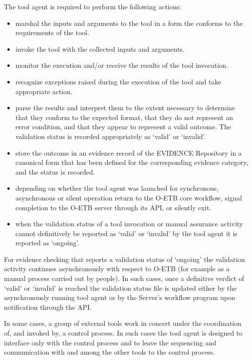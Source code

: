 \documentclass[12pt,twoside,a4paper]{article}
\begin{document}
The tool agent is required to perform the following actions:

\begin{itemize}
\item
  marshal the inputs and arguments to the tool in a form the conforms to the requirements of the tool.
\item
  invoke the tool with the collected inputs and arguments.
\item
  monitor the execution and/or receive the results of the tool invocation.
\item
  recognize exceptions raised during the execution of the tool and take appropriate action.
\item
  parse the results and interpret them to the extent necessary to determine that they conform to the expected format, that they do not represent an error condition, and that they appear to represent a valid outcome. The validation status is recorded appropriately as `valid' or `invalid'.
\item
  store the outcome in an evidence record of the EVIDENCE Repository in a canonical form that has been defined for the corresponding evidence category, and the status is recorded.
\item
  depending on whether the tool agent was launched for synchronous, asynchronous or silent operation return to the O-ETB core workflow, signal completion to the O-ETB server through its API, or silently exit.
\item
  when the validation status of a tool invocation or manual assurance activity cannot definitively be reported as `valid' or `invalid' by the tool agent it is reported as `ongoing'.
\end{itemize}

For evidence checking that reports a validation status of `ongoing' the validation activity continues asynchronously with respect to O-ETB (for example as a manual process carried out by people). In such cases, once a definitive verdict of `valid' or `invalid' is reached the validation status file is updated either by the asynchronously running tool agent or by the Server's workflow program upon notification through the API.

In some cases, a group of external tools work in concert under the coordination of, and invoked by, a control process. In such cases the tool agent is designed to interface only with the control process and to leave the sequencing and communication with and among the other tools to the control process.
\end{document}
